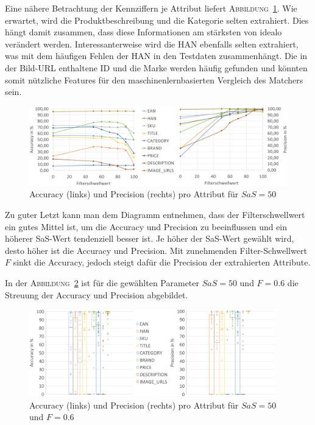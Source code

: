 Eine nähere Betrachtung der Kennziffern je Attribut liefert \textsc{Abbildung}~\ref{abb:accuracy-precision-chart}.
Wie erwartet, wird die Produktbeschreibung und die Kategorie selten extrahiert.
Dies hängt damit zusammen, dass diese Informationen am stärksten von idealo verändert werden.
Interessanterweise wird die HAN ebenfalls selten extrahiert, was mit dem häufigen Fehlen der HAN in den
Testdaten zusammenhängt.
Die in der Bild-URL enthaltene ID und die Marke werden häufig gefunden und könnten somit nützliche Features
für den maschinenlernbasierten Vergleich des Matchers sein.

\begin{figure}[H]
    \centering
    \includegraphics[width=\textwidth]{resources/accuracy-and-precision-per-attribute.PNG}
    \caption{Accuracy (links) und Precision (rechts) pro Attribut für $SaS=50$}
    \label{abb:accuracy-precision-chart}
    \vspace{-0.25cm}
\end{figure}

Zu guter Letzt kann man dem Diagramm entnehmen, dass der Filterschwellwert ein gutes Mittel ist, um die Accuracy und
Precision zu beeinflussen und ein höherer SaS-Wert tendenziell besser ist.
Je höher der SaS-Wert gewählt wird, desto höher ist die Accuracy und Precision.
Mit zunehmenden Filter-Schwellwert $F$ sinkt die Accuracy, jedoch steigt dafür die Precision der extrahierten Attribute.

In der \textsc{Abbildung}~\ref{abb:accuracy-precision-box-plot} ist für die gewählten Parameter $SaS=50$ und $F=0.6$
die Streuung der Accuracy und Precision abgebildet.

\begin{figure}[h]
    \centering
    \includegraphics[width=0.95\textwidth]{resources/accuracy-and-precision-box-plots.png}
    \caption{Accuracy (links) und Precision (rechts) pro Attribut für $SaS=50$ und $F=0.6$}
    \label{abb:accuracy-precision-box-plot}
    \vspace{-0.25cm}
\end{figure}

